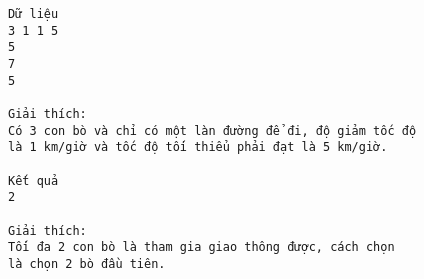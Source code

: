 \begin{verbatim}
Dữ liệu
3 1 1 5
5
7
5

Giải thích:
Có 3 con bò và chỉ có một làn đường để đi, độ giảm tốc độ 
là 1 km/giờ và tốc độ tối thiểu phải đạt là 5 km/giờ.

Kết quả
2

Giải thích:
Tối đa 2 con bò là tham gia giao thông được, cách chọn 
là chọn 2 bò đầu tiên.
\end{verbatim}
